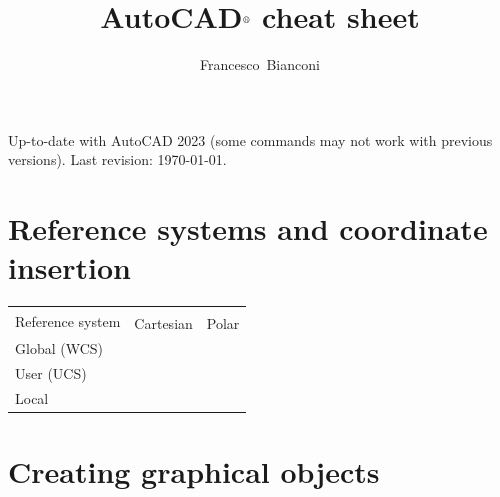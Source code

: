 \documentclass[..]{../IEEEphot}
\begin{document}
\title{AutoCAD$^{\text{\textregistered}}$ cheat sheet}

\author{Francesco~Bianconi}


\maketitle
%
%
\thispagestyle{empty}

\vspace{-1.0cm}
\noindent Up-to-date with AutoCAD 2023 (some commands may not work with previous versions). Last revision: \today.

\tableofcontents
	
\clearpage

\section{Reference systems and coordinate insertion}
\begin{longtable}{m{.3\linewidth}>{\centering\arraybackslash}p{.3\linewidth}>{\centering\arraybackslash}p{.3\linewidth}}
\toprule
\multirow{2}{*}{Reference system} & \multicolumn{2}{c}{Insertion mode} \\
\cmidrule{2-3}
 & Cartesian & Polar \\
\midrule
Global (WCS) & \multicolumn{1}{c}{*$x$,$y$} & \multicolumn{1}{c}{*$\rho<\theta$} \\
User (UCS) & \multicolumn{1}{c}{$x$,$y$} & \multicolumn{1}{c}{$\rho<\theta$} \\
Local & \multicolumn{1}{c}{@$x$,$y$} & \multicolumn{1}{c}{@$\rho<\theta$} \\
\bottomrule
\end{longtable}

\section{Creating graphical objects}
\end{document}
